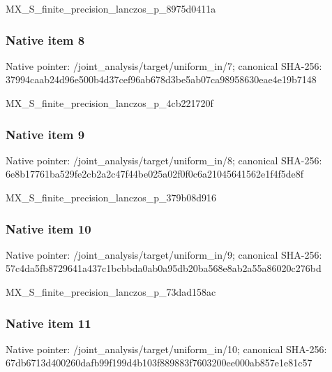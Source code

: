 \documentclass[10pt,a4paper]{article}
\begin{document}
\begingroup\raggedright\sloppy MX\_\allowbreak{}S\_\allowbreak{}finite\_\allowbreak{}precision\_\allowbreak{}lanczos\_\allowbreak{}p\_\allowbreak{}8975d0411a\par\endgroup

\subsubsection{Native item 8}
Native pointer: /joint\_\allowbreak{}analysis/target/uniform\_\allowbreak{}in/7; canonical SHA-256: 37994caab24d96e500b4d37cef96ab678d3be5ab07ca98958630eae4e19b7148

\begingroup\raggedright\sloppy MX\_\allowbreak{}S\_\allowbreak{}finite\_\allowbreak{}precision\_\allowbreak{}lanczos\_\allowbreak{}p\_\allowbreak{}4cb221720f\par\endgroup

\subsubsection{Native item 9}
Native pointer: /joint\_\allowbreak{}analysis/target/uniform\_\allowbreak{}in/8; canonical SHA-256: 6e8b17761ba529fe2cb2a2c47f44be025a02f0f0c6a21045641562e1f4f5de8f

\begingroup\raggedright\sloppy MX\_\allowbreak{}S\_\allowbreak{}finite\_\allowbreak{}precision\_\allowbreak{}lanczos\_\allowbreak{}p\_\allowbreak{}379b08d916\par\endgroup

\subsubsection{Native item 10}
Native pointer: /joint\_\allowbreak{}analysis/target/uniform\_\allowbreak{}in/9; canonical SHA-256: 57c4da5fb8729641a437c1bcbbda0ab0a95db20ba568e8ab2a55a86020c276bd

\begingroup\raggedright\sloppy MX\_\allowbreak{}S\_\allowbreak{}finite\_\allowbreak{}precision\_\allowbreak{}lanczos\_\allowbreak{}p\_\allowbreak{}73dad158ac\par\endgroup

\subsubsection{Native item 11}
Native pointer: /joint\_\allowbreak{}analysis/target/uniform\_\allowbreak{}in/10; canonical SHA-256: 67db6713d400260dafb99f199d4b103f889883f7603200ee000ab857e1e81c57
\end{document}
